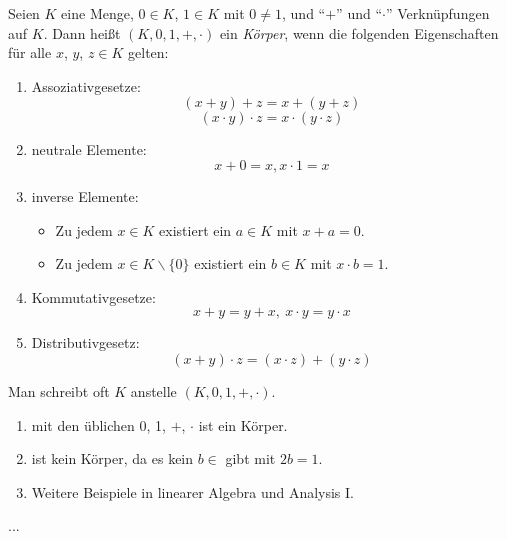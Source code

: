 \documentclass[12pt]{scrreprt}
\begin{document}
\begin{dfn}
\label{dfn:zahlen.koerper}
Seien $K$ eine Menge, $0 \in K$, $1 \in K$ mit $0 \ne 1$, und "`$+$"' und "`$\cdot$"' Verknüpfungen auf 
$K$. Dann heißt $(K, 0, 1, +, \cdot)$ ein \emph{Körper}, wenn die folgenden Eigenschaften für alle 
$x$, $y$, $z \in K$ gelten:

\begin{enumerate}
\item Assoziativgesetze:
\[(x + y) + z = x + (y + z)\]
\[(x \cdot y) \cdot z = x \cdot (y \cdot z)\]

\item neutrale Elemente:
\[x + 0 = x, x \cdot 1 = x\]

\item inverse Elemente:
\begin{itemize}
  \item Zu jedem $x \in K$ existiert ein $a \in K$ mit $x + a = 0$.
  \item Zu jedem $x \in K \backslash \{0\}$ existiert ein $b \in K$ mit $x \cdot b = 1$.
\end{itemize}

\item Kommutativgesetze:
\[x + y = y + x,\ x \cdot y = y \cdot x\]

\item Distributivgesetz:
\[(x + y) \cdot z = (x \cdot z) + (y \cdot z)\]
\end{enumerate}

Man schreibt oft $K$ anstelle $(K, 0, 1, +, \cdot)$.
\end{dfn}

\begin{bsp*}
\begin{enumerate}
\item {} mit den üblichen 0, 1, $+$, $\cdot$ ist ein Körper.
\item {} ist kein Körper, da es kein $b \in$  gibt mit $2b = 1$.
\item Weitere Beispiele in linearer Algebra und Analysis I.
\end{enumerate}
\end{bsp*}

...
\end{document}
